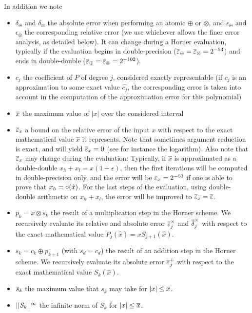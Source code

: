In addition we note 
\begin{itemize}
  
\item $\delta_\oplus$ and $\delta_\otimes$ the absolute error when
  performing an atomic $\oplus$ or $\otimes$, and $\epsilon_\oplus$
  and $\epsilon_\otimes$ the corresponding relative error (we use
  whichever allows the finer error analysis, as detailed below).  It
  can change during a Horner evaluation, typically if the evaluation
  begins in double-precision
  (${\overline{\varepsilon}}_\oplus={\overline{\varepsilon}}_\otimes=2^{-53}$) and ends in double-double
  (${\overline{\varepsilon}}_\oplus={\overline{\varepsilon}}_\otimes=2^{-102}$).

\item $c_j$ the coefficient of $P$ of degree $j$, considered exactly
  representable (if $c_j$ is an approximation to some exact value
  $\hat{c_j}$, the corresponding error is taken into account in the
  computation of the approximation error for this polynomial)

\item ${\overline{x}}$ the maximum value of $|x|$ over the considered interval
  
\item ${\overline{\varepsilon}}_x$  a bound on the relative error of the input $x$
  with respect to the exact mathematical value $\hat{x}$ it
  represents. Note that sometimes argument reduction is exact, and
  will yield ${\overline{\varepsilon}}_x=0$ (see for instance the logarithm). Also
  note that ${\overline{\varepsilon}}_x$ may change during the evaluation: Typically,
  if $\hat{x}$ is approximated as a double-double
  $x_h+x_l=\hat{x}(1+\epsilon)$, then the first iterations will be
  computed in double-precision only, and the error will be
  ${\overline{\varepsilon}}_x=2^{-53}$ if one is able to prove that
  $x_h=\circ(\hat{x})$. For the last steps of the evaluation, using
  double-double arithmetic on $x_h+x_l$, the error will be improved to
  ${\overline{\varepsilon}}_x={\overline{\varepsilon}}$.
  
\item $p_k = x \otimes s_k $ the result of a multiplication step in
  the Horner scheme. We recursively evaluate its relative and absolute
  error ${\overline{\varepsilon}}^\times_j$ and ${\overline{\delta}}^\times_j$ with respect to
  the exact mathematical value $P_j(\hat{x})=xS_{j+1}(\hat{x})$.

\item $s_k = c_k \oplus p_{k+1}$ (with $s_d = c_d$)  the result of
  an addition step in the Horner scheme. We recursively evaluate its absolute
  error ${\overline{\varepsilon}}^+_j$ with respect to the exact mathematical value $S_k(\hat{x})$.

\item $\overline{s}_{k}$ the  maximum value that $s_k$ may take for $|x|
  \le {\overline{x}}$.

\item $||{S_k}||^{\infty}$ the infinite norm of $S_k$ for $|x| \leq {\overline{x}}$.

\end{itemize}

